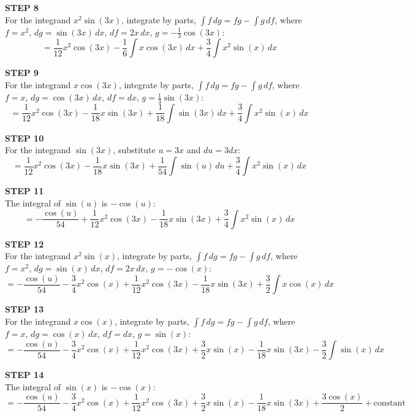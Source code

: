 \textbf{STEP 8} \\
For the integrand \( x^2 \sin(3 x) \), integrate by parts, \( \int f \, dg = f g - \int g \, df \), where 
\( f = x^2 \), \( dg = \sin(3 x) \, dx \), \( df = 2 x \, dx \), \( g = -\frac{1}{3} \cos(3 x) \):
\[ = \frac{1}{12} x^2 \cos(3 x) - \frac{1}{6} \int x \cos(3 x) \, dx + \frac{3}{4} \int x^2 \sin(x) \, dx \]

\textbf{STEP 9} \\
For the integrand \( x \cos(3 x) \), integrate by parts, \( \int f \, dg = f g - \int g \, df \), where 
\( f = x \), \( dg = \cos(3 x) \, dx \), \( df = dx \), \( g = \frac{1}{3} \sin(3 x) \):
\[ = \frac{1}{12} x^2 \cos(3 x) - \frac{1}{18} x \sin(3 x) + \frac{1}{18} \int \sin(3 x) \, dx + \frac{3}{4} \int x^2 \sin(x) \, dx \]

\textbf{STEP 10} \\
For the integrand \( \sin(3 x) \), substitute \( u = 3 x \) and \( du = 3 dx \):
\[ = \frac{1}{12} x^2 \cos(3 x) - \frac{1}{18} x \sin(3 x) + \frac{1}{54} \int \sin(u) \, du + \frac{3}{4} \int x^2 \sin(x) \, dx \]

\textbf{STEP 11} \\
The integral of \( \sin(u) \) is \( -\cos(u) \):
\[ = -\frac{\cos(u)}{54} + \frac{1}{12} x^2 \cos(3 x) - \frac{1}{18} x \sin(3 x) + \frac{3}{4} \int x^2 \sin(x) \, dx \]

\textbf{STEP 12} \\
For the integrand \( x^2 \sin(x) \), integrate by parts, \( \int f \, dg = f g - \int g \, df \), where 
\( f = x^2 \), \( dg = \sin(x) \, dx \), \( df = 2 x \, dx \), \( g = -\cos(x) \):
\[ = -\frac{\cos(u)}{54} - \frac{3}{4} x^2 \cos(x) + \frac{1}{12} x^2 \cos(3 x) - \frac{1}{18} x \sin(3 x) + \frac{3}{2} \int x \cos(x) \, dx \]

\textbf{STEP 13} \\
For the integrand \( x \cos(x) \), integrate by parts, \( \int f \, dg = f g - \int g \, df \), where 
\( f = x \), \( dg = \cos(x) \, dx \), \( df = dx \), \( g = \sin(x) \):
\[ = -\frac{\cos(u)}{54} - \frac{3}{4} x^2 \cos(x) + \frac{1}{12} x^2 \cos(3 x) + \frac{3}{2} x \sin(x) - \frac{1}{18} x \sin(3 x) - \frac{3}{2} \int \sin(x) \, dx \]

\textbf{STEP 14} \\
The integral of \( \sin(x) \) is \( -\cos(x) \):
\[ = -\frac{\cos(u)}{54} - \frac{3}{4} x^2 \cos(x) + \frac{1}{12} x^2 \cos(3 x) + \frac{3}{2} x \sin(x) - \frac{1}{18} x \sin(3 x) + \frac{3 \cos(x)}{2} + \text{constant} \]

